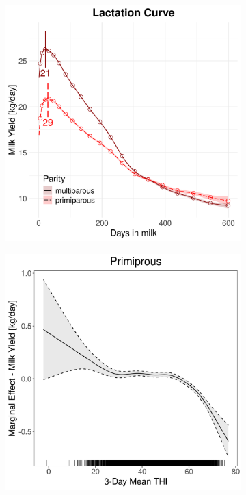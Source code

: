\begin{figure}[H]
\begin{subfigure}[b]{0.45\textwidth}
        \includegraphics[width=\textwidth]{thesis/figures/models/milk/after2010/ob_milk_after2010/ob_milk_after2010_marginal_dim_milk_combined.png}
    \end{subfigure}
    \begin{subfigure}[b]{0.45\textwidth}
        \centering
        \includegraphics[width=\textwidth]{thesis/figures/models/milk/after2010/ob_milk_after2010/ob_milk_after2010_marginal_thi_milk_primi.png}

\end{subfigure}
\end{figure}
